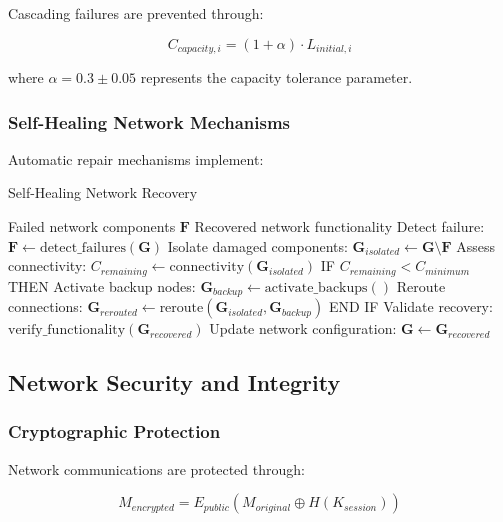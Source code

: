 Cascading failures are prevented through:

\begin{equation}
C_{capacity,i} = (1 + \alpha) \cdot L_{initial,i}
\end{equation}

where $\alpha = 0.3 \pm 0.05$ represents the capacity tolerance parameter.

\subsubsection{Self-Healing Network Mechanisms}

Automatic repair mechanisms implement:

\begin{algorithm}[H]
\caption{Self-Healing Network Recovery}
\begin{algorithmic}[1]
\REQUIRE Failed network components $\mathbf{F}$
\ENSURE Recovered network functionality
\STATE Detect failure: $\mathbf{F} \leftarrow \text{detect\_failures}(\mathbf{G})$
\STATE Isolate damaged components: $\mathbf{G}_{isolated} \leftarrow \mathbf{G} \setminus \mathbf{F}$
\STATE Assess connectivity: $C_{remaining} \leftarrow \text{connectivity}(\mathbf{G}_{isolated})$
\STATE IF $C_{remaining} < C_{minimum}$ THEN
\STATE \quad Activate backup nodes: $\mathbf{G}_{backup} \leftarrow \text{activate\_backups}()$
\STATE \quad Reroute connections: $\mathbf{G}_{rerouted} \leftarrow \text{reroute}(\mathbf{G}_{isolated}, \mathbf{G}_{backup})$
\STATE END IF
\STATE Validate recovery: $\text{verify\_functionality}(\mathbf{G}_{recovered})$
\STATE Update network configuration: $\mathbf{G} \leftarrow \mathbf{G}_{recovered}$
\end{algorithmic}
\end{algorithm}

\subsection{Network Security and Integrity}

\subsubsection{Cryptographic Protection}

Network communications are protected through:

\begin{equation}
M_{encrypted} = E_{public}(M_{original} \oplus H(K_{session}))
\end{equation}

